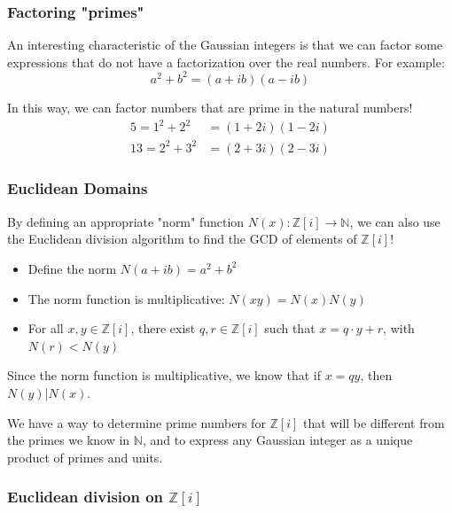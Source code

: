 \documentclass{beamer}
\begin{document}
\begin{frame}
	\frametitle{Factoring "primes"}

	An interesting characteristic of the Gaussian integers is that we can factor some
	expressions that do not have a factorization over the real numbers. For example:
	\[a^2 + b^2 = (a+ib)(a-ib) \]

	In this way, we can factor numbers that are prime in the natural numbers!
	\begin{align*}
		5 = 1^2 + 2^2 &= (1+2i)(1-2i) \\
		13 = 2^2 + 3^2 &= (2+3i)(2-3i)
	\end{align*}
\end{frame}

\begin{frame}
	\frametitle{Euclidean Domains}

	By defining an appropriate "norm" function $N(x):\mathbb{Z}[i]\rightarrow\mathbb{N}$,
	we can also use the Euclidean division algorithm to find the GCD of elements of
	$\mathbb{Z}[i]$!
	\begin{itemize}
		\item Define the norm $N(a+ib) = a^2 + b^2$
		\item The norm function is multiplicative: $N(xy) = N(x)N(y)$
		\item For all $x,y \in \mathbb{Z}[i]$, there exist $q,r \in \mathbb{Z}[i]$
			such that $x = q \cdot y + r$, with $N(r) < N(y)$
	\end{itemize}

	Since the norm function is multiplicative, we know that if $x = qy$, then $N(y)|N(x)$.

	We have a way to determine prime numbers for $\mathbb{Z}[i]$
	that will be different from the primes we know in $\mathbb{N}$, and to express any
	Gaussian integer as a unique product of primes and units.
\end{frame}

\begin{frame}
	\frametitle{Euclidean division on $\mathbb{Z}[i]$}


\end{frame}
\end{document}
